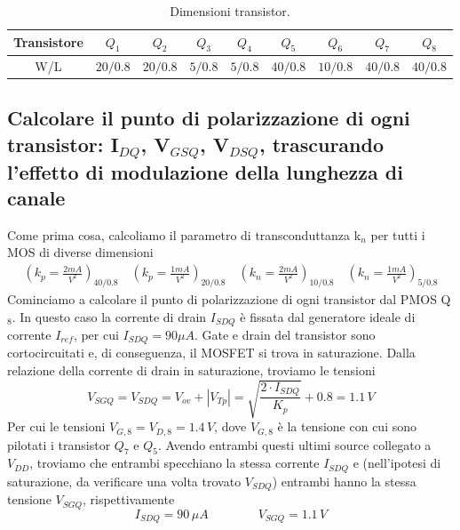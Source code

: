\documentclass[a4paper,10pt]{article}
\begin{document}
\begin{table}[h!]
\begin{center}
\begin{tabular}{ |c|c|c|c|c|c|c|c|c| } 
 \hline
   Transistore & $Q_1$ & $Q_2$ & $Q_3$ & $Q_4$ & $Q_5$ & $Q_6$ & $Q_7$ & $Q_8$ \\ 
  \hline
 W/L & $20/0.8$ & $20/0.8$ & $5/0.8$ & $5/0.8$ & $40/0.8$ & $10/0.8$ & $40/0.8$ & $40/0.8$ \\ 
 \hline
\end{tabular}
 \caption{Dimensioni transistor.}
\label{tabelladim}
\end{center}
\end{table}

\subsection{Calcolare il punto di polarizzazione di ogni transistor: I$_{DQ}$, V$_{GSQ}$, V$_{DSQ}$, trascurando l'effetto di modulazione della lunghezza di canale}
Come prima cosa, calcoliamo il parametro di transconduttanza k$_n$ per tutti i MOS di diverse dimensioni
\begin{align*}
\left( k_p=\frac{2mA}{V^2} \right)_{40/0.8} \quad  \left( k_p=\frac{1mA}{V^2} \right)_{20/0.8} \quad \left( k_n=\frac{2mA}{V^2} \right)_{10/0.8} \quad\left( k_n=\frac{1mA}{V^2} \right)_{5/0.8}
\end{align*}
Cominciamo a calcolare il punto di polarizzazione di ogni transistor dal PMOS Q$_8$. In questo caso la corrente di drain $I_{SDQ}$ è fissata dal generatore ideale di corrente $I_{\mathit{ref}}$, per cui $I_{SDQ}=90\mu A$. Gate e drain del transistor sono cortocircuitati e, di conseguenza, il MOSFET si trova in saturazione. Dalla relazione della corrente di drain in saturazione, troviamo le tensioni
\begin{equation*}
V_{SGQ}= V_{SDQ} = V_{ov} + \left| V_{Tp} \right| = \sqrt{\frac{2 \cdot I_{SDQ}}{K_p}} + 0.8 = 1.1\,V 
\end{equation*}
Per cui le tensioni $V_{G,8}=V_{D,8}=1.4\, V$, dove $V_{G,8}$ è la tensione con cui sono pilotati i transistor $Q_7$ e $Q_5$. Avendo entrambi questi ultimi source collegato a $V_{DD}$, troviamo che entrambi specchiano la stessa corrente $I_{SDQ}$ e (nell'ipotesi di saturazione, da verificare una volta trovato $V_{SDQ}$) entrambi hanno la stessa tensione $V_{SGQ}$, rispettivamente
\begin{equation*}
I_{SDQ}=90\, \mu A \qquad \qquad V_{SGQ}=1.1\,V
\end{equation*}
\end{document}
